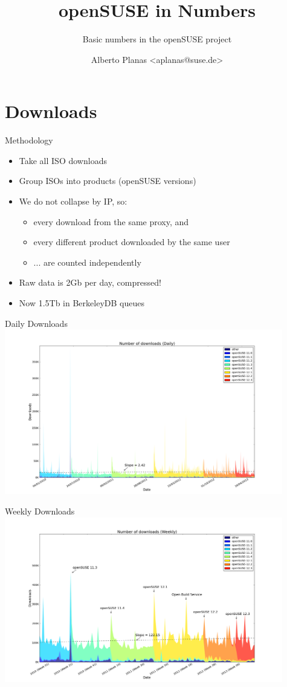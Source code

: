 \documentclass{beamer}
\author{Alberto Planas <aplanas@suse.de>\newline {\small openSUSE Team}}
\title{openSUSE in Numbers}
\subtitle{Basic numbers in the openSUSE project}
\begin{document}
\begin{frame}[t,plain]
  \titlepage
\end{frame}


\section{Downloads}

\begin{frame}{Methodology}
  \begin{itemize}
  \item Take all ISO downloads
  \item Group ISOs into products (openSUSE versions)
  \item We do not collapse by IP, so:
    \begin{itemize}
    \item every download from the same proxy, and
    \item every different product downloaded by the same user
    \item ... are counted independently
    \end{itemize}
  \item Raw data is 2Gb per day, compressed!
  \item Now 1.5Tb in BerkeleyDB queues
  \end{itemize}
\end{frame}

\begin{frame}{Daily Downloads}
  \includegraphics[height=7.2cm]{download_day}
\end{frame}

\begin{frame}{Weekly Downloads}
  \includegraphics[height=7.2cm]{download_week}
\end{frame}
\end{document}
